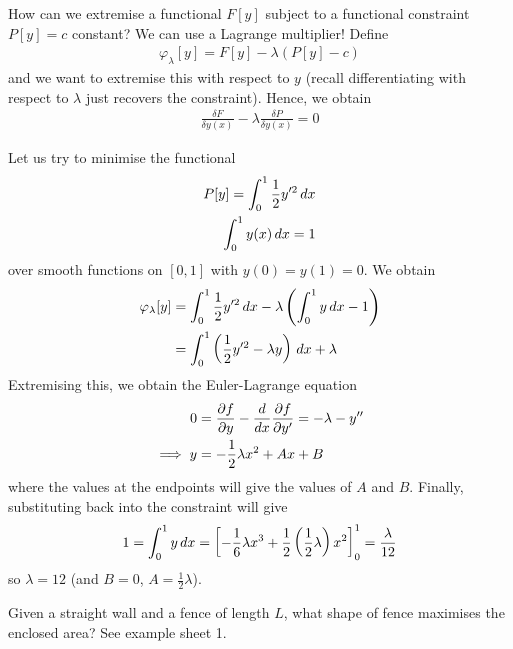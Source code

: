 \documentclass{../../template/note}
\begin{document}
    How can we extremise a functional $F[y]$ subject to a functional constraint $P[y] = c$ constant? We can use a Lagrange multiplier! Define
    \begin{align*}
        \varphi_\lambda[y] = F[y] - \lambda(P[y]-c)
    \end{align*}
    and we want to extremise this with respect to $y$ (recall differentiating with respect to $\lambda$ just recovers the constraint). Hence, we obtain
    \begin{align*}
        \frac{\delta F}{\delta y(x)} - \lambda \frac{\delta P}{\delta y(x)} = 0
    \end{align*}

    \begin{example*}
        Let us try to minimise the functional
        \begin{align*}
            P[y] = \int_0^1 \frac 1 2 y'^2 \,d{x} \\
            \int_0^1 y(x) \,d{x} = 1
        \end{align*}
        over smooth functions on $[0, 1]$ with $y(0) = y(1) = 0$. We obtain
        \begin{align*}
            \varphi_\lambda[y] &= \int_0^1 \frac 1 2 y'^2 \,d{x} - \lambda \left(\int_0^1 y \,d{x} - 1\right) \\
            &= \int_0^1 \left(\frac 1 2 y'^2 - \lambda y\right) \,d{x} + \lambda
        \end{align*}
        Extremising this, we obtain the Euler-Lagrange equation
        \begin{align*}
            0 &= \pd{f}{y} - \frac{d}{dx} \pd{f}{y'} = -\lambda - y'' \\
            \implies y &= - \frac 1 2 \lambda x^2 + Ax + B
        \end{align*}
        where the values at the endpoints will give the values of $A$ and $B$. Finally, substituting back into the constraint will give
        \begin{align*}
            1 = \int_0^1 y \,d{x} = \left[-\frac 1 6 \lambda x^3 + \frac 1 2\left(\frac 1 2 \lambda\right) x^2\right]_0^1 = \frac{\lambda}{12}
        \end{align*}
        so $\lambda = 12$ (and $B = 0$, $A = \frac 1 2 \lambda$).           
    \end{example*}
    
    \begin{example*}
        Given a straight wall and a fence of length $L$, what shape of fence maximises the enclosed area? See example sheet 1.
    \end{example*}
\end{document}
